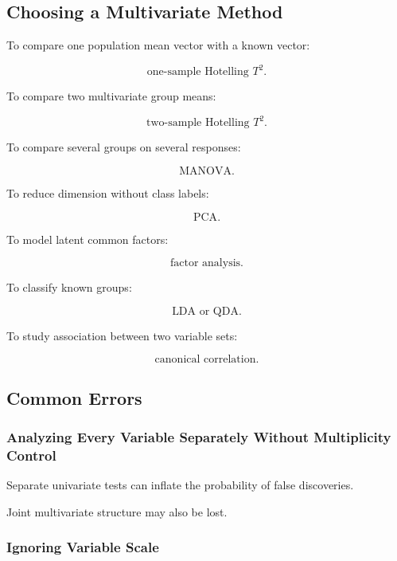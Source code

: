 \subsection{Choosing a Multivariate Method}
\label{subsec:choosing-multivariate-method}

To compare one population mean vector with a known vector:

\[
\boxed{
\text{one-sample Hotelling }T^2.
}
\]

To compare two multivariate group means:

\[
\boxed{
\text{two-sample Hotelling }T^2.
}
\]

To compare several groups on several responses:

\[
\boxed{
\text{MANOVA}.
}
\]

To reduce dimension without class labels:

\[
\boxed{
\text{PCA}.
}
\]

To model latent common factors:

\[
\boxed{
\text{factor analysis}.
}
\]

To classify known groups:

\[
\boxed{
\text{LDA or QDA}.
}
\]

To study association between two variable sets:

\[
\boxed{
\text{canonical correlation}.
}
\]

\subsection{Common Errors}
\label{subsec:multivariate-common-errors}

\subsubsection{Analyzing Every Variable Separately Without Multiplicity Control}

Separate univariate tests can inflate the probability of false
discoveries.

Joint multivariate structure may also be lost.

\subsubsection{Ignoring Variable Scale}


